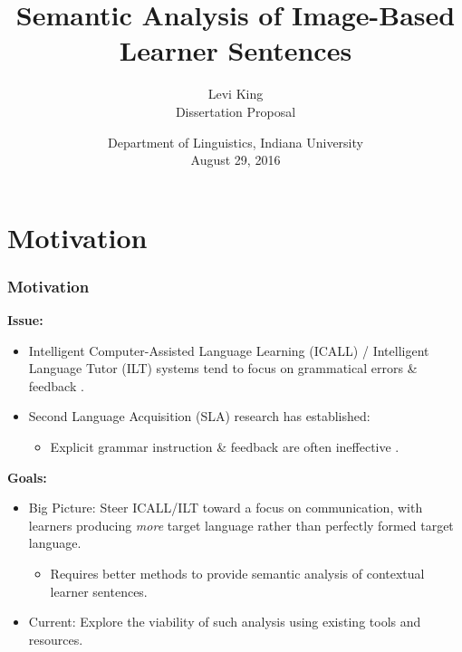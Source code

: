 \documentclass{beamer}
\title{Semantic Analysis of Image-Based \\ Learner Sentences}
\author[Levi King]{Levi King \\ Dissertation Proposal}
\date{Department of Linguistics, Indiana University \\ August 29, 2016}
\begin{document}
\maketitle

\section{Motivation}
\begin{frame}
\frametitle{Motivation}

\textbf{Issue:}
\begin{itemize}
\item Intelligent Computer-Assisted Language Learning (ICALL) / Intelligent Language Tutor (ILT) systems tend to focus on grammatical errors \& feedback \citep{heift:schulze:07, meurers:12}. %
 
\item Second Language Acquisition (SLA) research has established:
  \begin{itemize}
  \item Explicit grammar instruction \& feedback are often ineffective \citep{Ellis:2006:CurrentIssues}.
  \end{itemize} 
\end{itemize}


\textbf{Goals:} 
\begin{itemize}
\item Big Picture: Steer ICALL/ILT toward a focus on communication, with learners producing \textit{more} target language rather than perfectly formed target language.
\begin{itemize}
\item Requires better methods to provide semantic analysis of contextual learner sentences.
\end{itemize}
\item Current: Explore the viability of such analysis using existing tools and resources.
\end{itemize}

\end{frame}

%
%
\end{document}
